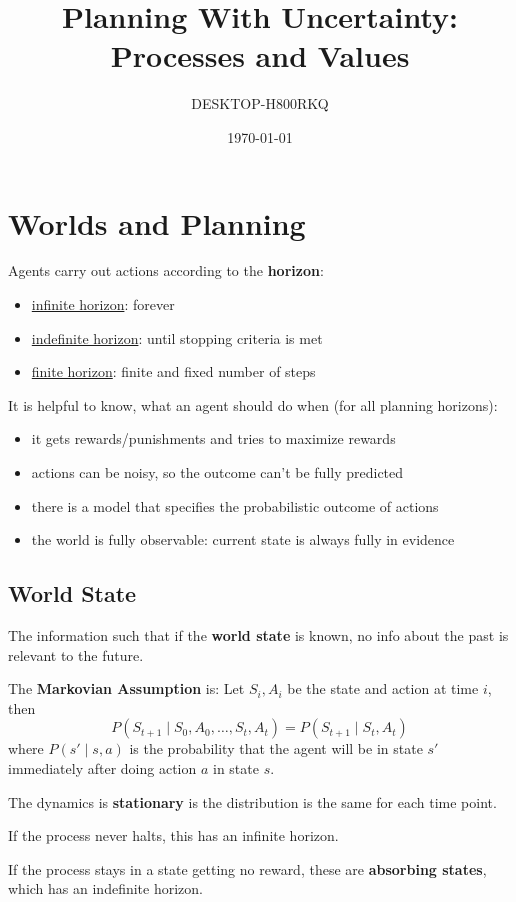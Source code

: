 \documentclass[11pt]{article}
\author{DESKTOP-H800RKQ}
\date{\today}
\title{Planning With Uncertainty: Processes and Values}
\begin{document}
\maketitle
\tableofcontents

\section{Worlds and Planning}
\label{sec:orgd614d2c}
Agents carry out actions according to the \textbf{horizon}:
\begin{itemize}
\item \uline{infinite horizon}: forever
\item \uline{indefinite horizon}: until stopping criteria is met
\item \uline{finite horizon}: finite and fixed number of steps
\end{itemize}

It is helpful to know, what an agent should do when (for all planning horizons):
\begin{itemize}
\item it gets rewards/punishments and tries to maximize rewards
\item actions can be noisy, so the outcome can't be fully predicted
\item there is a model that specifies the probabilistic outcome of actions
\item the world is fully observable: current state is always fully in evidence
\end{itemize}
\subsection{World State}
\label{sec:org6fdfd3b}
The information such that if the \textbf{world state} is known, no info about
the past is relevant to the future.

The \textbf{Markovian Assumption} is: Let \(S_{i}, A_{i}\) be the state and action at
time \(i\), then
$$ P(S_{t+1} \mid S_{0}, A_{0}, \dots, S_{t}, A_{t}) = P(S_{t+1} \mid S_{t}, A_{t}) $$
where \(P(s' \mid s, a)\) is the probability that the agent will be in state \(s'\)
immediately after doing action \(a\) in state \(s\).

The dynamics is \textbf{stationary} is the distribution is the same for each time point.

If the process never halts, this has an infinite horizon.

If the process stays in a state getting no reward, these are \textbf{absorbing states},
which has an indefinite horizon.
\end{document}
